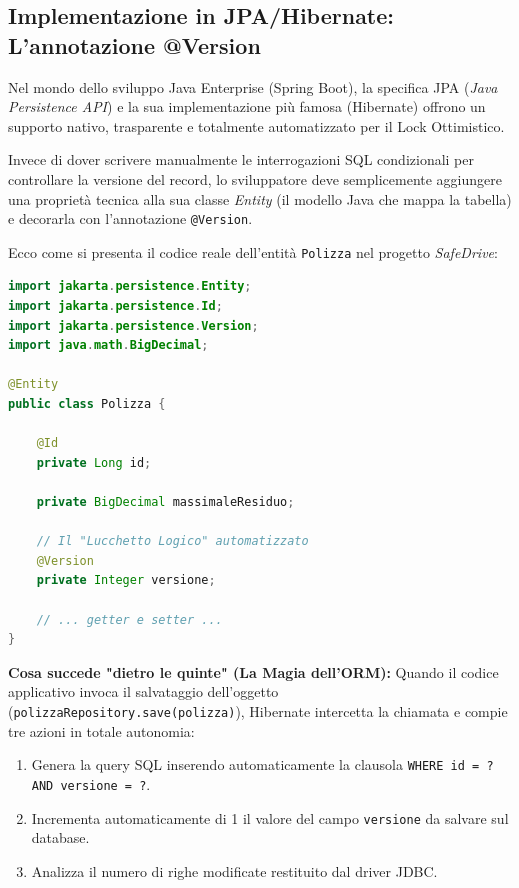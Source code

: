 \subsection{Implementazione in JPA/Hibernate: L'annotazione @Version}

Nel mondo dello sviluppo Java Enterprise (Spring Boot), la specifica JPA (\textit{Java Persistence API}) e la sua implementazione più famosa (Hibernate) offrono un supporto nativo, trasparente e totalmente automatizzato per il Lock Ottimistico.

Invece di dover scrivere manualmente le interrogazioni SQL condizionali per controllare la versione del record, lo sviluppatore deve semplicemente aggiungere una proprietà tecnica alla sua classe \textit{Entity} (il modello Java che mappa la tabella) e decorarla con l'annotazione \texttt{@Version}.

\begin{example}
Ecco come si presenta il codice reale dell'entità \texttt{Polizza} nel progetto \textit{SafeDrive}:
\begin{lstlisting}[language=Java, basicstyle=\ttfamily\small, keywordstyle=\color{blue}\bfseries]
import jakarta.persistence.Entity;
import jakarta.persistence.Id;
import jakarta.persistence.Version;
import java.math.BigDecimal;

@Entity
public class Polizza {

    @Id
    private Long id;
    
    private BigDecimal massimaleResiduo;
    
    // Il "Lucchetto Logico" automatizzato
    @Version
    private Integer versione;
    
    // ... getter e setter ...
}
\end{lstlisting}
\end{example}

\textbf{Cosa succede "dietro le quinte" (La Magia dell'ORM):}
Quando il codice applicativo invoca il salvataggio dell'oggetto (\texttt{polizzaRepository.save(polizza)}), Hibernate intercetta la chiamata e compie tre azioni in totale autonomia:
\begin{enumerate}
    \item Genera la query SQL inserendo automaticamente la clausola \texttt{WHERE id = ? AND versione = ?}.
    \item Incrementa automaticamente di 1 il valore del campo \texttt{versione} da salvare sul database.
    \item Analizza il numero di righe modificate restituito dal driver JDBC.
\end{enumerate}

